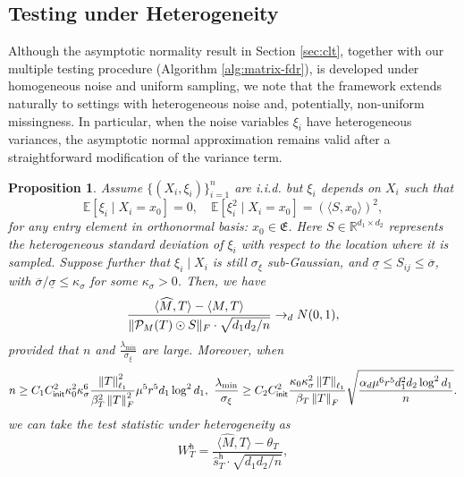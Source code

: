 \documentclass[12pt]{article}
\newcommand{\tF}{{\rm F}}
\newcommand{\norm}[1]{\left\lVert#1\right\rVert}
\newcommand{\R}{\mathbb{R}}
\newcommand{\E}{\mathbb{E}}
\newcommand{\cP}{\mathcal{P}}
\newcommand{\init}{{\mathsf{init}}}
\theoremstyle{plain}
\newtheorem{Proposition}{Proposition}
\begin{document}
\begin{sloppypar}
\subsection{Testing under Heterogeneity}\label{sec:hetero}
Although the asymptotic normality result in Section \ref{sec:clt}, together with our multiple testing procedure (Algorithm \ref{alg:matrix-fdr}), is developed under homogeneous noise and uniform sampling, we note that the framework extends naturally to settings with heterogeneous noise and, potentially, non-uniform missingness. In particular, when the noise variables $\xi_i$ have heterogeneous variances, the asymptotic normal approximation remains valid after a straightforward modification of the variance term.

\begin{Proposition}\label{prop:hetero} Assume $\{(X_i,\xi_i)\}_{i=1}^n$ are i.i.d. but $\xi_i$ depends on $X_i$ such that 
\begin{equation*}
    \E[\xi_i\mid X_i= x_0 ] = 0, \quad \E[\xi_i^2\mid X_i= x_0 ] = \left(\langle S, x_0 \rangle\right)^2,
\end{equation*}
for any entry element in  orthonormal basis: $x_0 \in \mathfrak{E}$. Here $S\in\R^{d_1\times d_2}$ represents the  heterogeneous standard deviation of $\xi_i$ with respect to the location where it is sampled. Suppose further that $\xi_i\mid X_i$ is still $\sigma_\xi$ sub-Gaussian, and $\underline{\sigma}\le S_{ij}\le \overline{\sigma}$, with $\overline{\sigma}/\underline{\sigma} \le \kappa_{\sigma}$ for some $\kappa_\sigma >0$. Then, we have  
\begin{equation}\label{eq:hetero-noise-clt}
    \frac{\langle \widehat{M}, T\rangle-\langle M, T\rangle}{\|\cP_M(T) \odot S \|_\tF \cdot \sqrt{d_1 d_2 / n}} \to_d N(0,1),
\end{equation}
provided that $n$ and $\frac{\lambda_{\min}}{\sigma_{\xi}} $ are large. Moreover, when 
    \begin{equation}\label{eq:condition-SNR-sample-hetero}
    n\ge  C_1 C_{\init}^2\kappa_0^2 \kappa_{\sigma}^6\frac{\norm{T}_{\ell_1}^2}{\beta_T^2\norm{T}_{\tF}^2} \mu^{5}r^5 d_1\log^2 d_1, \ \frac{\lambda_{\min}}{\sigma_{\xi}} \ge  C_2 C_{\init}^2 \frac{\kappa_0\kappa_{\sigma}^2\norm{T}_{\ell_1}}{\beta_T\norm{T}_\tF } \sqrt{\frac{ \alpha_{d} \mu^{6} r^5 d_1^2 d_2  \log^2 d_1 }{ n } }.
\end{equation}
we can take the test statistic under  heterogeneity as
\begin{equation}\label{eq:test-stat-hetero}
    W_{T}^{\mathsf{h}} =  \frac{\langle \widehat{M}, T\rangle-\theta_T}{ \widehat{s}_T^{ \mathsf{h} } \cdot \sqrt{d_1 d_2 / n}}, 

\end{equation}
\end{Proposition}
\end{sloppypar}
\end{document}
